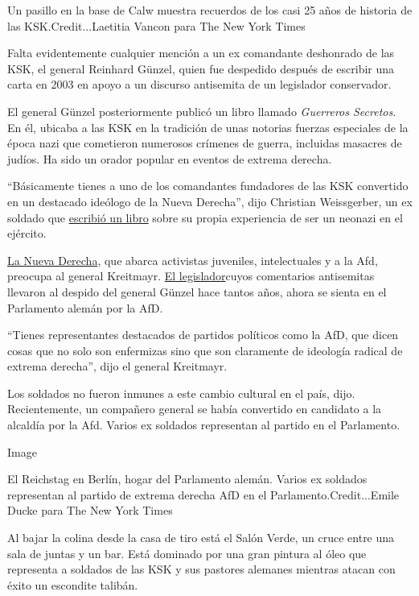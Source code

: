 Un pasillo en la base de Calw muestra recuerdos de los casi 25 años de
historia de las KSK.Credit...Laetitia Vancon para The New York Times

Falta evidentemente cualquier mención a un ex comandante deshonrado de
las KSK, el general Reinhard Günzel, quien fue despedido después de
escribir una carta en 2003 en apoyo a un discurso antisemita de un
legislador conservador.

El general Günzel posteriormente publicó un libro llamado
\emph{Guerreros Secretos}. En él, ubicaba a las KSK en la tradición de
unas notorias fuerzas especiales de la época nazi que cometieron
numerosos crímenes de guerra, incluidas masacres de judíos. Ha sido un
orador popular en eventos de extrema derecha.

``Básicamente tienes a uno de los comandantes fundadores de las KSK
convertido en un destacado ideólogo de la Nueva Derecha'', dijo
Christian Weissgerber, un ex soldado que
\href{https://www.ofv.ch/sachbuch/detail/mein-vaterland-warum-ich-ein-neonazi-war/103760/}{escribió
un libro} sobre su propia experiencia de ser un neonazi en el ejército.

\href{https://www.nytimes.com/es/2019/01/01/espanol/neonazis-alemania-extrema-derecha.html}{La
Nueva Derecha}, que abarca activistas juveniles, intelectuales y a la
Afd, preocupa al general Kreitmayr.
\href{https://www.martinhohmann.de/}{El legislador}cuyos comentarios
antisemitas llevaron al despido del general Günzel hace tantos años,
ahora se sienta en el Parlamento alemán por la AfD.

``Tienes representantes destacados de partidos políticos como la AfD,
que dicen cosas que no solo son enfermizas sino que son claramente de
ideología radical de extrema derecha'', dijo el general Kreitmayr.

Los soldados no fueron inmunes a este cambio cultural en el país, dijo.
Recientemente, un compañero general se había convertido en candidato a
la alcaldía por la Afd. Varios ex soldados representan al partido en el
Parlamento.

Image

El Reichstag en Berlín, hogar del Parlamento alemán. Varios ex soldados
representan al partido de extrema derecha AfD en el
Parlamento.Credit...Emile Ducke para The New York Times

Al bajar la colina desde la casa de tiro está el Salón Verde, un cruce
entre una sala de juntas y un bar. Está dominado por una gran pintura al
óleo que representa a soldados de las KSK y sus pastores alemanes
mientras atacan con éxito un escondite talibán.

